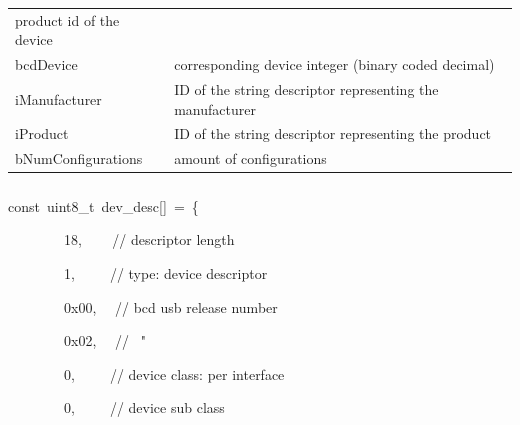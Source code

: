 \begin{longtable}[]{@{}ll@{}}
\begin{minipage}[t]{0.47\columnwidth}\raggedright\strut
{product id of the device}
\strut\end{minipage}\tabularnewline
\begin{minipage}[t]{0.47\columnwidth}\raggedright\strut
{bcdDevice}
\strut\end{minipage} &
\begin{minipage}[t]{0.47\columnwidth}\raggedright\strut
{corresponding device integer (binary coded decimal)}
\strut\end{minipage}\tabularnewline
\begin{minipage}[t]{0.47\columnwidth}\raggedright\strut
{iManufacturer}
\strut\end{minipage} &
\begin{minipage}[t]{0.47\columnwidth}\raggedright\strut
{ID of the string descriptor representing the manufacturer}
\strut\end{minipage}\tabularnewline
\begin{minipage}[t]{0.47\columnwidth}\raggedright\strut
{iProduct}
\strut\end{minipage} &
\begin{minipage}[t]{0.47\columnwidth}\raggedright\strut
{ID of the string descriptor representing the product}
\strut\end{minipage}\tabularnewline
\begin{minipage}[t]{0.47\columnwidth}\raggedright\strut
{bNumConfigurations}
\strut\end{minipage} &
\begin{minipage}[t]{0.47\columnwidth}\raggedright\strut
{amount of configurations}

{}
\strut\end{minipage}\tabularnewline
\bottomrule
\end{longtable}

\subparagraph{\texorpdfstring{{}}{}}\label{h.giqf6ezfcdwp}

{const}{~}{uint8\_t}{~dev\_desc}{{[}{]}}{~}{=}{~\{}

{~~~~~~~~}{18}{,}{~ ~ ~}{// descriptor length}

{~~~~~~~~}{1}{,}{~ ~ ~ }{// type: device descriptor}

{~~~~~~~~}{0x00}{,}{~ ~}{// bcd usb release number}

{~~~~~~~~}{0x02}{,}{~ ~}{// ~"}

{~~~~~~~~}{0}{,}{~ ~ ~ }{// device class: per interface}

{~~~~~~~~}{0}{,}{~ ~ ~ }{// device sub class}

